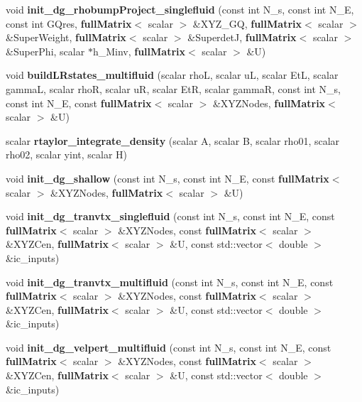 \begin{DoxyCompactItemize}
\item 
void {\bfseries init\-\_\-dg\-\_\-rhobump\-Project\-\_\-singlefluid} (const int N\-\_\-s, const int N\-\_\-\-E, const int G\-Qres, {\bf full\-Matrix}$<$ scalar $>$ \&X\-Y\-Z\-\_\-\-G\-Q, {\bf full\-Matrix}$<$ scalar $>$ \&Super\-Weight, {\bf full\-Matrix}$<$ scalar $>$ \&Superdet\-J, {\bf full\-Matrix}$<$ scalar $>$ \&Super\-Phi, scalar $\ast$h\-\_\-\-Minv, {\bf full\-Matrix}$<$ scalar $>$ \&U)\label{init__cond_8h_a832b4cdedee81b5eb9193874a9182883}

\item 
void {\bfseries build\-L\-Rstates\-\_\-multifluid} (scalar rho\-L, scalar u\-L, scalar Et\-L, scalar gamma\-L, scalar rho\-R, scalar u\-R, scalar Et\-R, scalar gamma\-R, const int N\-\_\-s, const int N\-\_\-\-E, const {\bf full\-Matrix}$<$ scalar $>$ \&X\-Y\-Z\-Nodes, {\bf full\-Matrix}$<$ scalar $>$ \&U)\label{init__cond_8h_abf0d45c3303a86810fb3bb83e5c55d80}

\item 
scalar {\bfseries rtaylor\-\_\-integrate\-\_\-density} (scalar A, scalar B, scalar rho01, scalar rho02, scalar yint, scalar H)\label{init__cond_8h_a8fc5015cacc8b485da99b556bcd4523f}

\item 
void {\bfseries init\-\_\-dg\-\_\-shallow} (const int N\-\_\-s, const int N\-\_\-\-E, const {\bf full\-Matrix}$<$ scalar $>$ \&X\-Y\-Z\-Nodes, {\bf full\-Matrix}$<$ scalar $>$ \&U)\label{init__cond_8h_ab925bf9fb2c60220628e218e1c530d70}

\item 
void {\bfseries init\-\_\-dg\-\_\-tranvtx\-\_\-singlefluid} (const int N\-\_\-s, const int N\-\_\-\-E, const {\bf full\-Matrix}$<$ scalar $>$ \&X\-Y\-Z\-Nodes, const {\bf full\-Matrix}$<$ scalar $>$ \&X\-Y\-Z\-Cen, {\bf full\-Matrix}$<$ scalar $>$ \&U, const std\-::vector$<$ double $>$ \&ic\-\_\-inputs)\label{init__cond_8h_ad3c7b4a445de0cb89c26615bffa3d76a}

\item 
void {\bfseries init\-\_\-dg\-\_\-tranvtx\-\_\-multifluid} (const int N\-\_\-s, const int N\-\_\-\-E, const {\bf full\-Matrix}$<$ scalar $>$ \&X\-Y\-Z\-Nodes, const {\bf full\-Matrix}$<$ scalar $>$ \&X\-Y\-Z\-Cen, {\bf full\-Matrix}$<$ scalar $>$ \&U, const std\-::vector$<$ double $>$ \&ic\-\_\-inputs)\label{init__cond_8h_adca88d4a88266161095097054c36d7b4}

\item 
void {\bfseries init\-\_\-dg\-\_\-velpert\-\_\-multifluid} (const int N\-\_\-s, const int N\-\_\-\-E, const {\bf full\-Matrix}$<$ scalar $>$ \&X\-Y\-Z\-Nodes, const {\bf full\-Matrix}$<$ scalar $>$ \&X\-Y\-Z\-Cen, {\bf full\-Matrix}$<$ scalar $>$ \&U, const std\-::vector$<$ double $>$ \&ic\-\_\-inputs)\label{init__cond_8h_a10d8612d0bfbe8587556c05b7df649ff}


\end{DoxyCompactItemize}

